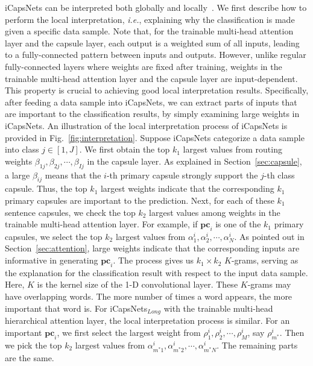 \documentclass[10pt,journal,compsoc]{IEEEtran}
\begin{document}
iCapsNets can be interpreted both globally and locally~\cite{du2018techniques}. We first describe how to perform the local interpretation, \emph{i.e.}, explaining why the classification is made given a specific data sample. Note that, for the trainable multi-head attention layer and the capsule layer, each output is a weighted sum of all inputs, leading to a fully-connected pattern between inputs and outputs. However, unlike regular fully-connected layers where weights are fixed after training, weights in the trainable multi-head attention layer and the capsule layer are input-dependent. This property is crucial to achieving good local interpretation results. Specifically, after feeding a data sample into iCapsNets, we can extract parts of inputs that are important to the classification results, by simply examining large weights in iCapsNets. An illustration of the local interpretation process of iCapsNets is provided in Fig.~\ref{fig:interpretation}. Suppose iCapsNets categorize a data sample into class $j \in [1, J]$. We first obtain the top $k_1$ largest values from routing weights $\beta_{1j}, \beta_{2j}, \cdots, \beta_{Ij}$ in the capsule layer. As explained in Section~\ref{sec:capsule}, a large $\beta_{ij}$ means that the $i$-th primary capsule strongly support the $j$-th class capsule. Thus, the top $k_1$ largest weights indicate that the corresponding $k_1$ primary capsules are important to the prediction. Next, for each of these $k_1$ sentence capsules, we check the top $k_2$ largest values among weights in the trainable multi-head attention layer. For example, if $\mathbf{pc}_i$ is one of the $k_1$ primary capsules, we select the top $k_2$ largest values from $\alpha^i_1, \alpha^i_2, \cdots, \alpha^i_N$. As pointed out in Section~\ref{sec:attention}, large weights indicate that the corresponding inputs are informative in generating $\mathbf{pc}_i$. The process gives us $k_1 \times k_2$ $K$-grams, serving as the explanation for the classification result with respect to the input data sample. Here, $K$ is the kernel size of the 1-D convolutional layer. These $K$-grams may have overlapping words. The more number of times a word appears, the more important that word is. For iCapsNets$_{Long}$ with the trainable multi-head hierarchical attention layer, the local interpretation process is similar. For an important $\mathbf{pc}_i$, we first select the largest weight from $\rho^i_1, \rho^i_2, \cdots, \rho^i_M$, say $\rho^i_{m^*}$. Then we pick the top $k_2$ largest values from $\alpha^i_{m^*1}, \alpha^i_{m^*2}, \cdots, \alpha^i_{m^*N}$. The remaining parts are the same.
\end{document}
